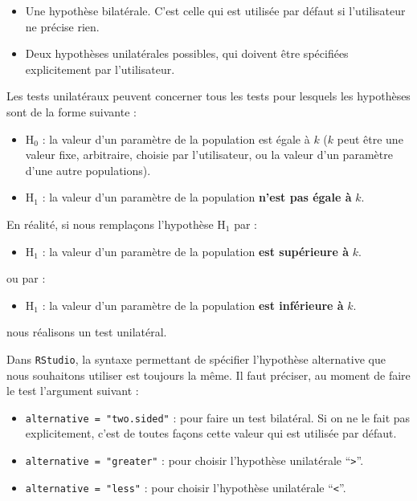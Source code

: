 \documentclass[
  a4paper,
  DIV=11,
  numbers=noendperiod,
  oneside]{scrreprt}
\providecommand{\tightlist}{%
  \setlength{\itemsep}{0pt}\setlength{\parskip}{0pt}}\usepackage{longtable,booktabs,array}
\begin{document}
\begin{itemize}
\tightlist
\item
  Une hypothèse bilatérale. C'est celle qui est utilisée par défaut si
  l'utilisateur ne précise rien.
\item
  Deux hypothèses unilatérales possibles, qui doivent être spécifiées
  explicitement par l'utilisateur.
\end{itemize}

Les tests unilatéraux peuvent concerner tous les tests pour lesquels les
hypothèses sont de la forme suivante :

\begin{itemize}
\tightlist
\item
  H\(_0\) : la valeur d'un paramètre de la population est égale à \(k\)
  (\(k\) peut être une valeur fixe, arbitraire, choisie par
  l'utilisateur, ou la valeur d'un paramètre d'une autre populations).
\item
  H\(_1\) : la valeur d'un paramètre de la population \textbf{n'est pas
  égale à} \(k\).
\end{itemize}

En réalité, si nous remplaçons l'hypothèse H\(_1\) par :

\begin{itemize}
\tightlist
\item
  H\(_1\) : la valeur d'un paramètre de la population \textbf{est
  supérieure à} \(k\).
\end{itemize}

ou par :

\begin{itemize}
\tightlist
\item
  H\(_1\) : la valeur d'un paramètre de la population \textbf{est
  inférieure à} \(k\).
\end{itemize}

nous réalisons un test unilatéral.

Dans \texttt{RStudio}, la syntaxe permettant de spécifier l'hypothèse
alternative que nous souhaitons utiliser est toujours la même. Il faut
préciser, au moment de faire le test l'argument suivant :

\begin{itemize}
\tightlist
\item
  \texttt{alternative\ =\ "two.sided"} : pour faire un test bilatéral.
  Si on ne le fait pas explicitement, c'est de toutes façons cette
  valeur qui est utilisée par défaut.
\item
  \texttt{alternative\ =\ "greater"} : pour choisir l'hypothèse
  unilatérale ``\texttt{\textgreater{}}''.
\item
  \texttt{alternative\ =\ "less"} : pour choisir l'hypothèse unilatérale
  ``\texttt{\textless{}}''.
\end{itemize}
\end{document}
